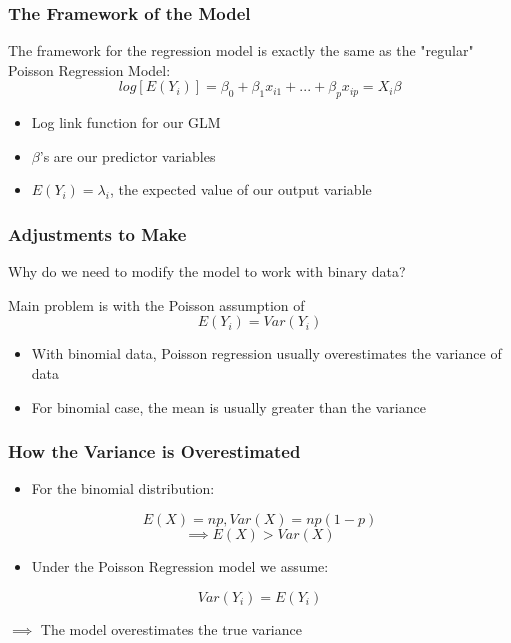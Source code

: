 \documentclass{beamer}
\begin{document}
\begin{frame}[fragile]\frametitle{The Framework of the Model}
	
	The framework for the regression model is exactly the same as the "regular" Poisson Regression Model:
	$$ log[E(Y_i)] = \beta_0 + \beta_1 x_{i1} + ... + \beta_p x_{ip} = X_i \beta $$  

	\begin{itemize}
	
		\item Log link function for our GLM
		
		\item $\beta$'s are our predictor variables	
		
		\item $E(Y_i) = \lambda_i$, the expected value of our output variable
	
	\end{itemize}

\end{frame}



\begin{frame}[fragile]\frametitle{Adjustments to Make}

	Why do we need to modify the model to work with binary data?

	Main problem is with the Poisson assumption of 	
	$$ E(Y_i) = Var(Y_i) $$ 
	\begin{itemize}

		\item With binomial data, Poisson regression usually overestimates the variance of data
		
		\item For binomial case, the mean is usually greater than the variance
		
	\end{itemize}
	
\end{frame}



\begin{frame}[fragile]\frametitle{How the Variance is Overestimated}

	\begin{itemize}
		\item For the binomial distribution: 
	\end{itemize}
		$$ E(X) = np, Var(X) = np(1-p) $$
		$$ \implies E(X) > Var(X) $$
	
	\begin{itemize}
		\item Under the Poisson Regression model we assume:
	\end{itemize}
		$$ Var(Y_i) = E(Y_i) $$
		
		$\implies$  The model overestimates the true variance
	
\end{frame}
\end{document}
